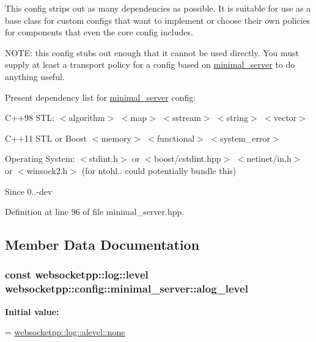 This config strips out as many dependencies as possible. It is suitable for use as a base class for custom configs that want to implement or choose their own policies for components that even the core config includes.

N\+O\+TE\+: this config stubs out enough that it cannot be used directly. You must supply at least a transport policy for a config based on {\ttfamily \hyperlink{structwebsocketpp_1_1config_1_1minimal__server}{minimal\+\_\+server}} to do anything useful.

Present dependency list for \hyperlink{structwebsocketpp_1_1config_1_1minimal__server}{minimal\+\_\+server} config\+:

C++98 S\+TL\+: $<$algorithm$>$ $<$map$>$ $<$sstream$>$ $<$string$>$ $<$vector$>$

C++11 S\+TL or Boost $<$memory$>$ $<$functional$>$ $<$system\+\_\+error$>$

Operating System\+: $<$stdint.\+h$>$ or $<$boost/cstdint.\+hpp$>$ $<$netinet/in.\+h$>$ or $<$winsock2.\+h$>$ (for ntohl.. could potentially bundle this)

\begin{DoxySince}{Since}
0..-\/dev 
\end{DoxySince}


Definition at line 96 of file minimal\+\_\+server.\+hpp.



\subsection{Member Data Documentation}
\subsubsection[{\texorpdfstring{alog\+\_\+level}{alog\_level}}]{\setlength{\rightskip}{0pt plus 5cm}const websocketpp\+::log\+::level websocketpp\+::config\+::minimal\+\_\+server\+::alog\+\_\+level\hspace{0.3cm}{\ttfamily [static]}}\hypertarget{structwebsocketpp_1_1config_1_1minimal__server_ae71d1728a8d49acd97ec29a6fdfd440c}{}\label{structwebsocketpp_1_1config_1_1minimal__server_ae71d1728a8d49acd97ec29a6fdfd440c}
{\bfseries Initial value\+:}
\begin{DoxyCode}
=
        \hyperlink{structwebsocketpp_1_1log_1_1alevel_a4cf0520816094999975fe73081cf30f2}{websocketpp::log::alevel::none}
\end{DoxyCode}


